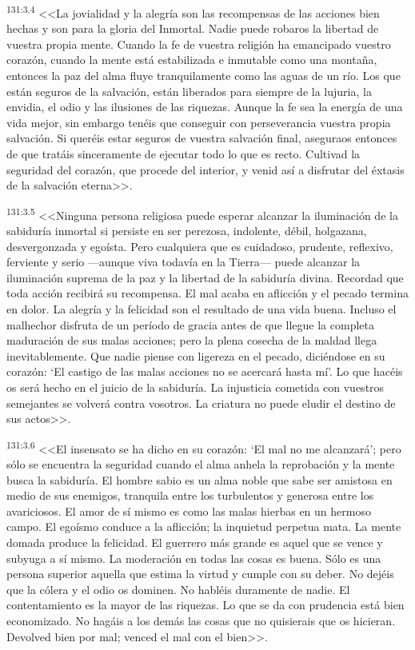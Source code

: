 \par 
\textsuperscript{131:3.4} <<La jovialidad y la alegría son las recompensas de las acciones bien hechas y son para la gloria del Inmortal. Nadie puede robaros la libertad de vuestra propia mente. Cuando la fe de vuestra religión ha emancipado vuestro corazón, cuando la mente está estabilizada e inmutable como una montaña, entonces la paz del alma fluye tranquilamente como las aguas de un río. Los que están seguros de la salvación, están liberados para siempre de la lujuria, la envidia, el odio y las ilusiones de las riquezas. Aunque la fe sea la energía de una vida mejor, sin embargo tenéis que conseguir con perseverancia vuestra propia salvación. Si queréis estar seguros de vuestra salvación final, aseguraos entonces de que tratáis sinceramente de ejecutar todo lo que es recto. Cultivad la seguridad del corazón, que procede del interior, y venid así a disfrutar del éxtasis de la salvación eterna>>.

\par 
\textsuperscript{131:3.5} <<Ninguna persona religiosa puede esperar alcanzar la iluminación de la sabiduría inmortal si persiste en ser perezosa, indolente, débil, holgazana, desvergonzada y egoísta. Pero cualquiera que es cuidadoso, prudente, reflexivo, ferviente y serio ---aunque viva todavía en la Tierra--- puede alcanzar la iluminación suprema de la paz y la libertad de la sabiduría divina. Recordad que toda acción recibirá su recompensa. El mal acaba en aflicción y el pecado termina en dolor. La alegría y la felicidad son el resultado de una vida buena. Incluso el malhechor disfruta de un período de gracia antes de que llegue la completa maduración de sus malas acciones; pero la plena cosecha de la maldad llega inevitablemente. Que nadie piense con ligereza en el pecado, diciéndose en su corazón: `El castigo de las malas acciones no se acercará hasta mí'. Lo que hacéis os será hecho en el juicio de la sabiduría. La injusticia cometida con vuestros semejantes se volverá contra vosotros. La criatura no puede eludir el destino de sus actos>>.

\par 
\textsuperscript{131:3.6} <<El insensato se ha dicho en su corazón: `El mal no me alcanzará'; pero sólo se encuentra la seguridad cuando el alma anhela la reprobación y la mente busca la sabiduría. El hombre sabio es un alma noble que sabe ser amistosa en medio de sus enemigos, tranquila entre los turbulentos y generosa entre los avariciosos. El amor de sí mismo es como las malas hierbas en un hermoso campo. El egoísmo conduce a la aflicción; la inquietud perpetua mata. La mente domada produce la felicidad. El guerrero más grande es aquel que se vence y subyuga a sí mismo. La moderación en todas las cosas es buena. Sólo es una persona superior aquella que estima la virtud y cumple con su deber. No dejéis que la cólera y el odio os dominen. No habléis duramente de nadie. El contentamiento es la mayor de las riquezas. Lo que se da con prudencia está bien economizado. No hagáis a los demás las cosas que no quisierais que os hicieran. Devolved bien por mal; venced el mal con el bien>>.

